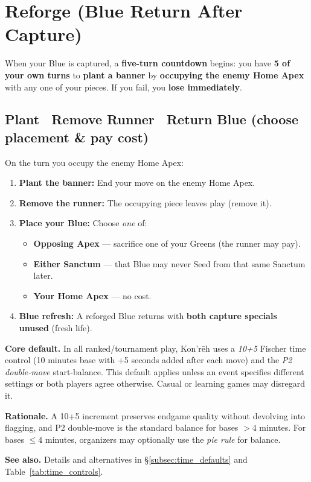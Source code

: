 \documentclass[11pt]{article}
\begin{document}
\section{Reforge (Blue Return After Capture)}\label{sec:reforge}
When your Blue is captured, a \textbf{five-turn countdown} begins: you have \textbf{5 of your own turns} to \textbf{plant a banner} by \textbf{occupying the enemy Home Apex} with any one of your pieces. If you fail, you \textbf{lose immediately}.

\subsection*{Plant \textrightarrow\ Remove Runner \textrightarrow\ Return Blue (choose placement & pay cost)}
On the turn you occupy the enemy Home Apex:
\begin{enumerate}
  \item \textbf{Plant the banner:} End your move on the enemy Home Apex.
  \item \textbf{Remove the runner:} The occupying piece leaves play (remove it).
  \item \textbf{Place your Blue:} Choose \emph{one} of:
  \begin{itemize}
     \item \textbf{Opposing Apex} — sacrifice one of your Greens (the runner may pay).
     \item \textbf{Either Sanctum} — that Blue may never Seed from that same Sanctum later.
  \item \textbf{Your Home Apex} — no cost.
  \end{itemize}
  \item \textbf{Blue refresh:} A reforged Blue returns with \textbf{both capture specials unused} (fresh life).
\end{enumerate}

\begin{tcolorbox}[title={Default Time \& Start-Balance Rule},label={box:default_time_rule}]
\textbf{Core default.} In all ranked/tournament play, Kon’rēh uses a \emph{10+5} Fischer time control
(10 minutes base with +5 seconds added after each move) and the \emph{P2 double-move} start-balance.
This default applies unless an event specifies different settings or both players agree otherwise.
Casual or learning games may disregard it.

\textbf{Rationale.} A 10+5 increment preserves endgame quality without devolving into flagging,
and P2 double-move is the standard balance for bases $>4$ minutes. For bases $\leq 4$ minutes,
organizers may optionally use the \emph{pie rule} for balance.

\textbf{See also.} Details and alternatives in \S\ref{subsec:time_defaults} and Table~\ref{tab:time_controls}.
\end{tcolorbox}
\end{document}
